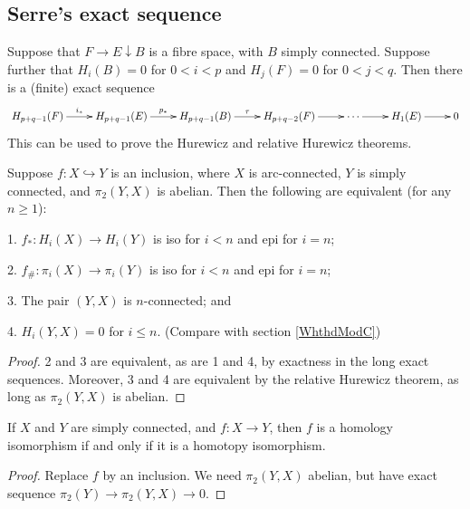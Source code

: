 \documentclass[11pt]{article}
\begin{document}
{\subsection{Serre's exact sequence}
Suppose that $F\rightarrow E\downarrow B$ is a fibre space, with $B$ simply connected. Suppose further that $H_i(B)=0$ for $0<i<p$ and $H_j(F)=0$ for $0<j<q$. Then there is a (finite) exact sequence
\[\xymatrix{
H_{p+q-1}(F)\ar[r]^{i_*}&H_{p+q-1}(E)\ar[r]^{p_*}&H_{p+q-1}(B)\ar[r]^{\tau}&H_{p+q-2}(F)\ar[r]&\cdots\ar[r]&H_1(E)\ar[r]&0
}\]
This can be used to prove the Hurewicz and relative Hurewicz theorems.
\begin{thm*}\label{Whthd}
Suppose $f:X\hookrightarrow Y$ is an inclusion, where $X$ is arc-connected, $Y$ is simply connected, and $\pi_2(Y,X)$ is abelian. Then the following are equivalent (for any $n\geq1$):
\begin{itemise}
\item[1.] $f_*:H_i(X)\to H_i(Y)$ is iso for $i<n$ and epi for $i=n$;
\item[2.] $f_\#:\pi_i(X)\to \pi_i(Y)$ is iso for $i<n$ and epi for $i=n$;
\item[3.] The pair $(Y,X)$ is $n$-connected; and
\item[4.] $H_i(Y,X)=0$ for $i\leq n$. \hfill (Compare with section \ref{WhthdModC})
\end{itemise}
\end{thm*}
\begin{proof}
2 and 3 are equivalent, as are 1 and 4, by exactness in the long exact sequences. Moreover, 3 and 4 are equivalent by the relative Hurewicz theorem, as long as $\pi_2(Y,X)$ is abelian.
\end{proof}
\begin{cor*} If $X$ and $Y$ are simply connected, and $f:X\to Y$, then $f$ is a homology isomorphism if and only if it is a homotopy isomorphism.
\begin{proof}
Replace $f$ by an inclusion. We need $\pi_2(Y,X)$ abelian, but have exact sequence $\pi_2(Y)\to\pi_2(Y,X)\to0$.
\end{proof}
\end{cor*}
\setcounter{subsection}{5}
}
\end{document}
